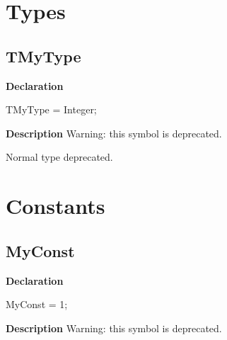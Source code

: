 \documentclass{report}
\begin{document}
\section{Types}
\subsection*{TMyType}
\begin{list}{}{
\setlength{\itemindent}{0cm}
\setlength{\listparindent}{0cm}
\setlength{\leftmargin}{\evensidemargin}
\addtolength{\leftmargin}{\tmplength}
\settowidth{\labelsep}{X}
\addtolength{\leftmargin}{\labelsep}
\setlength{\labelwidth}{\tmplength}
}
\begin{flushleft}
\item[\textbf{Declaration}\hfill]
\begin{ttfamily}
TMyType = Integer;\end{ttfamily}


\end{flushleft}
\par
\item[\textbf{Description}]
Warning: this symbol is deprecated.

 Normal type deprecated.

\end{list}
\section{Constants}
\subsection*{MyConst}
\begin{list}{}{
\setlength{\itemindent}{0cm}
\setlength{\listparindent}{0cm}
\setlength{\leftmargin}{\evensidemargin}
\addtolength{\leftmargin}{\tmplength}
\settowidth{\labelsep}{X}
\addtolength{\leftmargin}{\labelsep}
\setlength{\labelwidth}{\tmplength}
}
\begin{flushleft}
\item[\textbf{Declaration}\hfill]
\begin{ttfamily}
MyConst = 1;\end{ttfamily}


\end{flushleft}
\par
\item[\textbf{Description}]
Warning: this symbol is deprecated.

 

\end{list}
\end{document}
